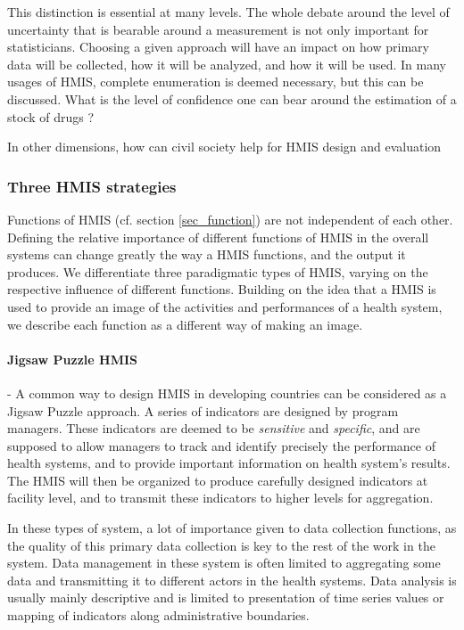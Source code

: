 \documentclass[a4paper,11pt,final,twoside]{article}
\begin{document}
This distinction is essential at many levels. The whole debate around the level of uncertainty that is bearable around a measurement is not only important for statisticians. Choosing a given approach will have an impact on how primary data will be collected, how it will be analyzed, and how it will be used. In many usages of HMIS, complete enumeration is deemed necessary, but this can be discussed. What is the level of confidence one can bear around the estimation of a stock of drugs ?

In other dimensions, how can civil society help for HMIS design and evaluation


\subsubsection{Three HMIS strategies}

Functions of HMIS (cf. section \ref{sec_function}) are not independent of each other. Defining the relative importance of different functions of HMIS in the overall systems can change greatly the way a HMIS functions, and the output it produces. We differentiate three paradigmatic types of HMIS, varying on the respective influence of different functions. Building on the idea that a HMIS is used to provide an image of the activities and performances of a health system, we describe each function as a different way of making an image.

\paragraph{Jigsaw Puzzle HMIS} - A common way to design HMIS in developing countries can be considered as a Jigsaw Puzzle approach. A series of indicators are designed by program managers. These indicators are deemed to be \textit{sensitive} and \textit{specific}, and are supposed to allow managers to track and identify precisely the performance of health systems, and to provide important information on health system's results. The HMIS will then be organized to produce carefully designed indicators at facility level, and to transmit these indicators to higher levels for aggregation.

In these types of system, a lot of importance given to data collection functions, as the quality of this primary data collection is key to the rest of the work in the system. Data management in these system is often limited to aggregating some data and transmitting it to different actors in the health systems. Data analysis is usually mainly descriptive and is limited to presentation of time series values or mapping of indicators along administrative boundaries.
\end{document}
